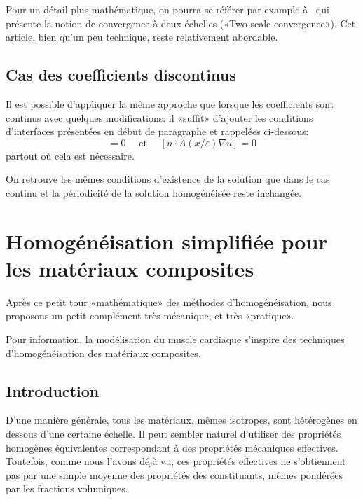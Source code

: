 \medskip
Pour un détail plus mathématique, on pourra se référer par example à~\cite{bib-Allaire2scale} qui présente la notion de convergence à deux échelles («Two-scale convergence»). Cet article, bien qu'un peu technique, reste relativement abordable.

\medskip
\subsection{Cas des coefficients discontinus}

Il est possible d'appliquer la même approche que lorsque les coefficients sont continus avec quelques modifications: il «suffit» d'ajouter les conditions d'interfaces présentées en début de paragraphe et rappelées ci-dessous:
\begin{equation} [u]=0 \quad \text{ et } \quad [n\cdot A(x/\varepsilon)\nabla u] = 0\end{equation}
partout où cela est nécessaire.

On retrouve les mêmes conditions d'existence de la solution que dans le cas continu et la périodicité de la solution homogénéisée reste inchangée.



\medskip
\section{Homogénéisation simplifiée pour les matériaux composites}

Après ce petit tour «mathématique» des méthodes d'homogénéisation, nous proposons un petit complément très mécanique, et très «pratique».

\medskip
Pour information, la modélisation du muscle cardiaque s'inspire des techniques d'homogénéisation des matériaux composites.


\medskip
\subsection{Introduction}

D'une manière générale, tous les matériaux, mêmes isotropes, sont hétérogènes en dessous d'une certaine échelle. Il peut sembler naturel d'utiliser des propriétés homogènes équivalentes correspondant à des propriétés mécaniques effectives. Toutefois, comme nous l'avons déjà vu, ces propriétés effectives ne s'obtiennent pas par une simple moyenne des propriétés des constituants, mêmes pondérées par les fractions volumiques.

